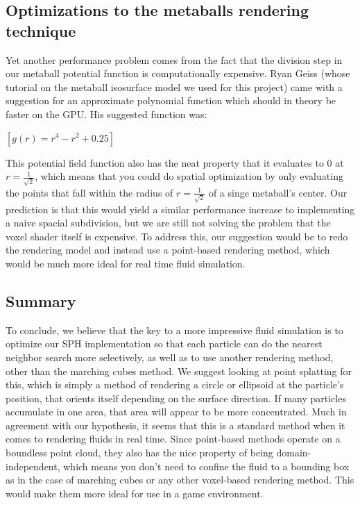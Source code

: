\documentclass{article}
\begin{document}
\begin{multicols}{2}
        \subsection{Optimizations to the metaballs rendering technique}
        Yet another performance problem comes from the fact that the division step in our metaball potential function is computationally expensive.
        Ryan Geiss (whose tutorial on the metaball isosurface model we used for this project) came with a suggestion for an approximate polynomial function which should in theory be faster on the GPU. His suggested function was:

        \begin{center}
        $[g(r) = r^4 - r^2 + 0.25]$
        \end{center}

        This potential field function also has the neat property that it evaluates to 0 at $r=\frac{1}{\sqrt{2}}$, which means that you could do spatial optimization by only evaluating the points that fall within the radius of $r=\frac{1}{\sqrt{2}}$ of a singe metaball's center.
        \cite{geiss00}
        Our prediction is that this would yield a similar performance increase to implementing a naive spacial subdivision, but we are still not solving the problem that the voxel shader itself is expensive.
        To address this, our suggestion would be to redo the rendering model and instead use a point-based rendering method, which would be much more ideal for real time fluid simulation.

        \subsection{Summary}
        To conclude, we believe that the key to a more impressive fluid simulation is to optimize our SPH implementation so that each particle can do the nearest neighbor search more selectively, as well as to use another rendering method, other than the marching cubes method.
        We suggest looking at point splatting for this, which is simply a method of rendering a circle or ellipsoid at the particle's position, that orients itself depending on the surface direction.
        If many particles accumulate in one area, that area will appear to be more concentrated.
        Much in agreement with our hypothesis, it seems that this is a standard method when it comes to rendering fluids in real time.
        Since point-based methods operate on a boundless point cloud, they also has the nice property of being domain-independent, which means you don't need to confine the fluid to a bounding box as in the case of marching cubes or any other voxel-based rendering method. This would make them more ideal for use in a game environment.


\end{multicols}
\end{document}
